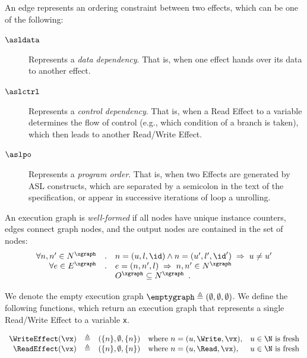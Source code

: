 An edge represents an ordering constraint between two effects, which can be one of the following:
\hypertarget{def-asldata}{}
\begin{description}
\item[$\asldata$] Represents a \emph{data dependency}.
That is, when one effect hands over its data to another effect.
\hypertarget{def-aslctrl}{}
\item[$\aslctrl$] Represents a \emph{control dependency}.
That is, when a Read Effect to a variable determines the flow of control (e.g., which condition of a branch is taken),
which then leads to another Read/Write Effect.
\hypertarget{def-aslpo}{}
\item[$\aslpo$] Represents a \emph{program order}.
That is, when two Effects are generated by ASL constructs, which are separated by a semicolon in the text of the specification,
or appear in successive iterations of loop a unrolling.
\end{description}

An execution graph is \emph{well-formed} if all nodes have unique instance counters, edges connect graph nodes,
and the output nodes are contained in the set of nodes:
\[
  \begin{array}{rcl}
  \forall n, n' \in N^\xgraph &.& n=(u,l,\id) \wedge n=(u',l',\id') \;\Rightarrow\; u \neq u' \\
  \forall e \in E^\xgraph &.& e=(n, n', l) \;\Rightarrow\; n, n' \in N^\xgraph \\
  & & O^\xgraph \subseteq N^\xgraph \enspace.
  \end{array}
\]
\hypertarget{def-emptygraph}{}

We denote the empty execution graph $\emptygraph \triangleq (\emptyset, \emptyset, \emptyset)$.
%
We define the following functions, which return an execution graph that represents a single Read/Write Effect to a variable \texttt{x}.
\hypertarget{def-writeeffect}{}
\hypertarget{def-readeffect}{}
\begin{definition}
\[
  \begin{array}{rclll}
    \WriteEffect(\vx) &\triangleq& (\{n\}, \emptyset, \{n\}) & \text{where } n=(u, \Write, \vx), & u\in\N \text{ is fresh}\\
    \ReadEffect(\vx)  &\triangleq& (\{n\}, \emptyset, \{n\}) & \text{where } n=(u, \Read, \vx),   & u\in\N \text{ is fresh}\\
  \end{array}
\]
\end{definition}

